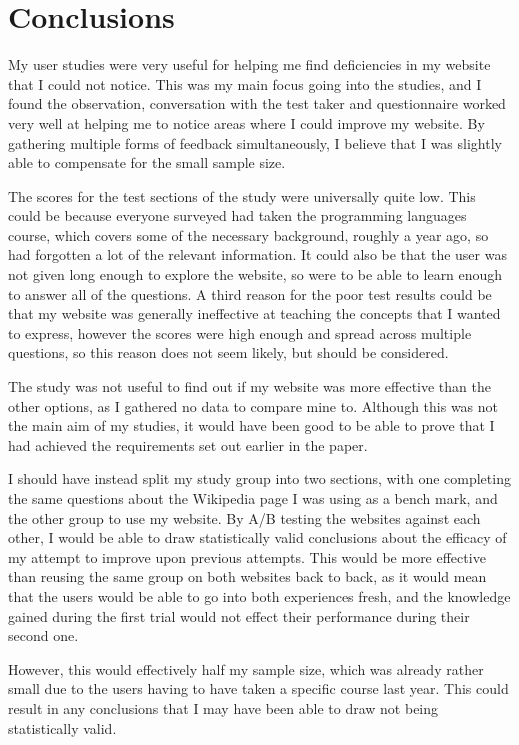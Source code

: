 \documentclass{l4proj}
\begin{document}
\section{Conclusions}

My user studies were very useful for helping me find deficiencies in my website that I could not notice.  This was my main focus going into the studies, and I found the observation, conversation with the test taker and questionnaire worked very well at helping me to notice areas where I could improve my website.  By gathering multiple forms of feedback simultaneously, I believe that I was slightly able to compensate for the small sample size.

The scores for the test sections of the study were universally quite low.  This could be because everyone surveyed had taken the programming languages course, which covers some of the necessary background, roughly a year ago, so had forgotten a lot of the relevant information.  It could also be that the user was not given long enough to explore the website, so were to be able to learn enough to answer all of the questions.  A third reason for the poor test results could be that my website was generally ineffective at teaching the concepts that I wanted to express, however the scores were high enough and spread across multiple questions, so this reason does not seem likely, but should be considered.

The study was not useful to find out if my website was more effective than the other options, as I gathered no data to compare mine to.  Although this was not the main aim of my studies, it would have been good to be able to prove that I had achieved the requirements set out earlier in the paper.

I should have instead split my study group into two sections, with one completing the same questions about the Wikipedia page I was using as a bench mark, and the other group to use my website.  By A/B testing the websites against each other, I would be able to draw statistically valid conclusions about the efficacy of my attempt to improve upon previous attempts.  This would be more effective than reusing the same group on both websites back to back, as it would mean that the users would be able to go into both experiences fresh, and the knowledge gained during the first trial would not effect their performance during their second one. 

However, this would effectively half my sample size, which was already rather small due to the users having to have taken a specific course last year. This could result in any conclusions that I may have been able to draw not being statistically valid.
\end{document}
